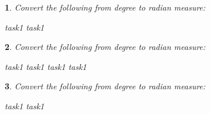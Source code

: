 \documentclass{article}
\newtheorem{question}{}
\begin{document}
\begin{question}
    Convert the following from degree to radian measure:
    \begin{tasks}
        \task task1
        \vspace{7 cm}
        \task task1
        \vspace{7 cm}
    \end{tasks}
\end{question}

\begin{question}
    Convert the following from degree to radian measure:
    \begin{tasks}
        \task task1
        \vspace{7 cm}
        \task task1
        \vspace{7 cm}
        \task task1
        \vspace{7 cm}
        \task task1
        \vspace{7 cm}
    \end{tasks}
\end{question}

\begin{question}
    Convert the following from degree to radian measure:
    \begin{tasks}
        \task task1
        \vspace{7 cm}
        \task task1
        \vspace{7 cm}
    \end{tasks}
\end{question}
\end{document}
